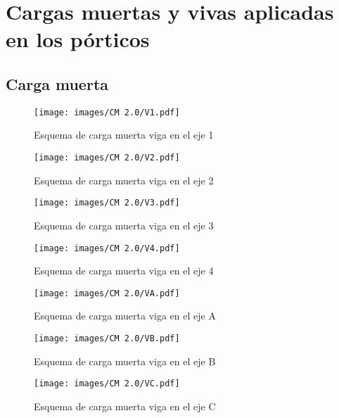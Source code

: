 \documentclass[12pt]{article}
\begin{document}
 
%  

\section{Cargas muertas y vivas aplicadas en los pórticos}
\subsection{Carga muerta}

\begin{figure}[H]
    \centering
    \texttt{[image: images/CM 2.0/V1.pdf]}
    \caption{Esquema de carga muerta viga en el eje 1}
    \label{fig:EsqVigaEje1}
\end{figure}

\begin{figure}[H]
    \centering
    \texttt{[image: images/CM 2.0/V2.pdf]}
    \caption{Esquema de carga muerta viga en el eje 2}
    \label{fig:EsqVigaEje2}
\end{figure}

\begin{figure}[H]
    \centering
    \texttt{[image: images/CM 2.0/V3.pdf]}
    \caption{Esquema de carga muerta viga en el eje 3}
    \label{fig:EsqVigaEje3}
\end{figure}

\begin{figure}[H]
    \centering
    \texttt{[image: images/CM 2.0/V4.pdf]}
    \caption{Esquema de carga muerta viga en el eje 4}
    \label{fig:EsqVigaEje4}
\end{figure}

\begin{figure}[H]
    \centering
    \texttt{[image: images/CM 2.0/VA.pdf]}
    \caption{Esquema de carga muerta viga en el eje A}
    \label{fig:EsqVigaEjeA}
\end{figure}

\begin{figure}[H]
    \centering
    \texttt{[image: images/CM 2.0/VB.pdf]}
    \caption{Esquema de carga muerta viga en el eje B}
    \label{fig:EsqVigaEjeB}
\end{figure}

\begin{figure}[H]
    \centering
    \texttt{[image: images/CM 2.0/VC.pdf]}
    \caption{Esquema de carga muerta viga en el eje C}
    \label{fig:EsqVigaEjeC}
\end{figure}
\end{document}
